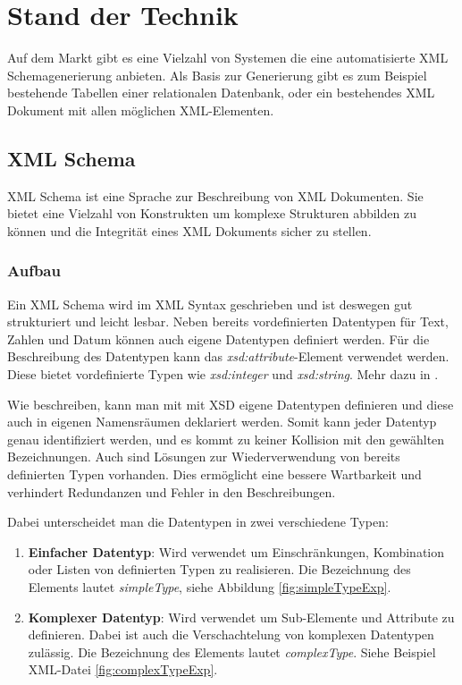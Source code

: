 \chapter{Stand der Technik}
\label{cha:technikstand}
Auf dem Markt gibt es eine Vielzahl von Systemen die eine automatisierte XML Schemagenerierung anbieten.
Als Basis zur Generierung gibt es zum Beispiel bestehende Tabellen einer relationalen Datenbank, oder ein bestehendes XML Dokument mit allen möglichen XML-Elementen. 

\section{XML Schema}
\label{cha:Schema}
XML Schema ist eine Sprache zur Beschreibung von XML Dokumenten. Sie bietet eine Vielzahl von Konstrukten um komplexe Strukturen abbilden zu können und die Integrität eines XML Dokuments sicher zu stellen.

\subsection{Aufbau}
Ein XML Schema wird im XML Syntax geschrieben und ist deswegen gut strukturiert und leicht lesbar.
Neben bereits vordefinierten Datentypen für Text, Zahlen und Datum können auch eigene Datentypen definiert werden. Für die Beschreibung des Datentypen kann das \emph{xsd:attribute}-Element verwendet werden. Diese bietet vordefinierte Typen wie \emph{xsd:integer} und \emph{xsd:string}. Mehr dazu in \cite{Wheeler2011}.

Wie \cite{Madhavan2001} beschreiben, kann man mit mit XSD eigene Datentypen definieren und diese auch in eigenen Namensräumen deklariert werden. Somit kann jeder Datentyp genau identifiziert werden, und es kommt zu keiner Kollision mit den gewählten Bezeichnungen.
Auch sind Lösungen zur Wiederverwendung von bereits definierten Typen vorhanden. Dies ermöglicht eine bessere Wartbarkeit und verhindert Redundanzen und Fehler in den Beschreibungen.

Dabei unterscheidet man die Datentypen in zwei verschiedene Typen:

\begin{enumerate}
\item \textbf{Einfacher Datentyp}: Wird verwendet um Einschränkungen, Kombination oder Listen von definierten Typen zu realisieren. Die Bezeichnung des Elements lautet \emph{simpleType}, siehe Abbildung \ref{fig:simpleTypeExp}.
\item \textbf{Komplexer Datentyp}: Wird verwendet um Sub-Elemente und Attribute zu definieren. Dabei ist auch die Verschachtelung von komplexen Datentypen zulässig. Die Bezeichnung des Elements lautet \emph{complexType}. Siehe Beispiel XML-Datei \ref{fig:complexTypeExp}.
\end{enumerate}

